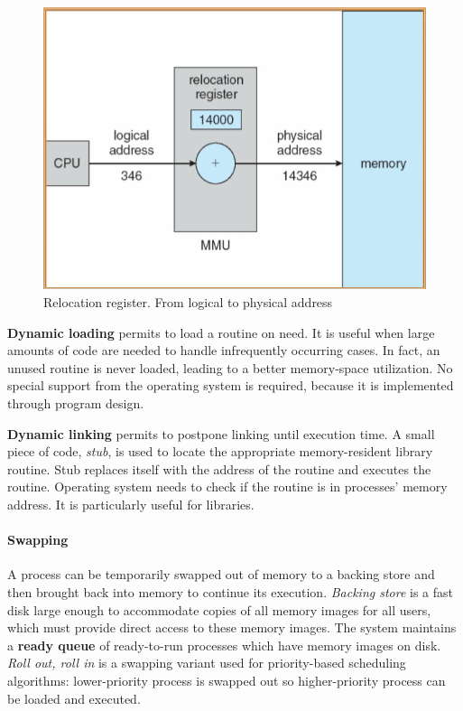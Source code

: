\begin{figure}[hbtp]
\centering
\includegraphics[scale=0.35]{images/memory_management/relocation_register.jpg}
\caption{Relocation register. From logical to physical address}
\end{figure}

\textbf{Dynamic loading} permits to load a routine on need. It is useful when large amounts of code are needed to handle infrequently occurring cases. In fact, an unused routine is never loaded, leading to a better memory-space utilization. No special support from the operating system is required, because it is implemented through program design.

\textbf{Dynamic linking} permits to postpone linking until execution time. A small piece of code, \emph{stub}, is used to locate the appropriate memory-resident library routine. Stub replaces itself with the address of the routine and executes the routine. Operating system needs to check if the routine is in processes' memory address. It is particularly useful for libraries.

\paragraph{Swapping}
A process can be temporarily swapped out of memory to a backing store and then brought back into memory to continue its execution. \emph{Backing store} is a fast disk large enough to accommodate copies of all memory images for all users, which must provide direct access to these memory images. The system maintains a \textbf{ready queue} of ready-to-run processes which have memory images on disk. \emph{Roll out, roll in} is a swapping variant used for priority-based scheduling algorithms: lower-priority process is swapped out so higher-priority process can be loaded and executed.

